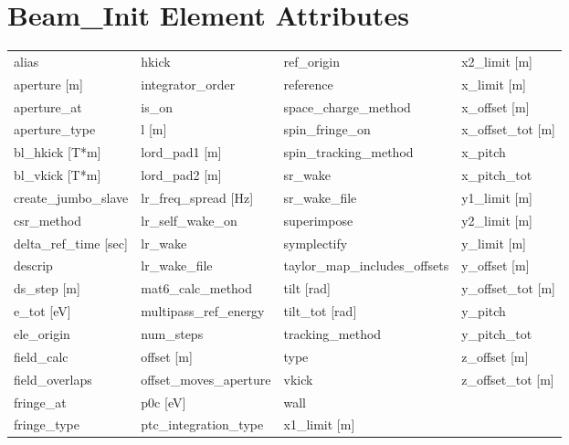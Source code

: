  \section{Beam_Init Element Attributes}
 \label{s:list.beam.init}
 
 \begin{tabular}{llll} \toprule
alias                          & hkick                          & ref_origin                     & x2_limit [m]                   \\
aperture [m]                   & integrator_order               & reference                      & x_limit [m]                    \\
aperture_at                    & is_on                          & space_charge_method            & x_offset [m]                   \\
aperture_type                  & l [m]                          & spin_fringe_on                 & x_offset_tot [m]               \\
bl_hkick [T*m]                 & lord_pad1 [m]                  & spin_tracking_method           & x_pitch                        \\
bl_vkick [T*m]                 & lord_pad2 [m]                  & sr_wake                        & x_pitch_tot                    \\
create_jumbo_slave             & lr_freq_spread [Hz]            & sr_wake_file                   & y1_limit [m]                   \\
csr_method                     & lr_self_wake_on                & superimpose                    & y2_limit [m]                   \\
delta_ref_time [sec]           & lr_wake                        & symplectify                    & y_limit [m]                    \\
descrip                        & lr_wake_file                   & taylor_map_includes_offsets    & y_offset [m]                   \\
ds_step [m]                    & mat6_calc_method               & tilt [rad]                     & y_offset_tot [m]               \\
e_tot [eV]                     & multipass_ref_energy           & tilt_tot [rad]                 & y_pitch                        \\
ele_origin                     & num_steps                      & tracking_method                & y_pitch_tot                    \\
field_calc                     & offset [m]                     & type                           & z_offset [m]                   \\
field_overlaps                 & offset_moves_aperture          & vkick                          & z_offset_tot [m]               \\
fringe_at                      & p0c [eV]                       & wall                           &                                \\
fringe_type                    & ptc_integration_type           & x1_limit [m]                   &                                \\
 \bottomrule
 \end{tabular}
